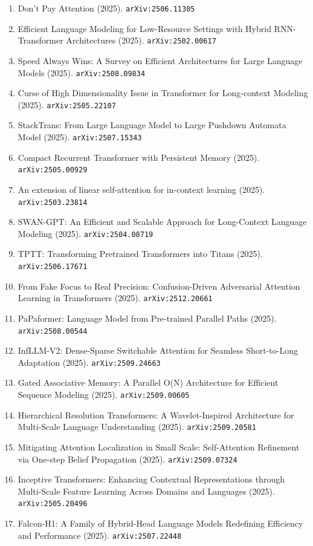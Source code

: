 \documentclass[11pt]{article}
\begin{document}
\begin{enumerate}
  \item Don't Pay Attention (2025). \texttt{arXiv:2506.11305}
  \item Efficient Language Modeling for Low-Resource Settings with Hybrid
  RNN-Transformer Architectures (2025). \texttt{arXiv:2502.00617}
  \item Speed Always Wins: A Survey on Efficient Architectures for Large Language Models (2025). \texttt{arXiv:2508.09834}
  \item Curse of High Dimensionality Issue in Transformer for Long-context Modeling (2025). \texttt{arXiv:2505.22107}
  \item StackTrans: From Large Language Model to Large Pushdown Automata Model (2025). \texttt{arXiv:2507.15343}
  \item Compact Recurrent Transformer with Persistent Memory (2025). \texttt{arXiv:2505.00929}
  \item An extension of linear self-attention for in-context learning (2025). \texttt{arXiv:2503.23814}
  \item SWAN-GPT: An Efficient and Scalable Approach for Long-Context Language
  Modeling (2025). \texttt{arXiv:2504.08719}
  \item TPTT: Transforming Pretrained Transformers into Titans (2025). \texttt{arXiv:2506.17671}
  \item From Fake Focus to Real Precision: Confusion-Driven Adversarial Attention Learning in Transformers (2025). \texttt{arXiv:2512.20661}
  \item PaPaformer: Language Model from Pre-trained Parallel Paths (2025). \texttt{arXiv:2508.00544}
  \item InfLLM-V2: Dense-Sparse Switchable Attention for Seamless Short-to-Long Adaptation (2025). \texttt{arXiv:2509.24663}
  \item Gated Associative Memory: A Parallel O(N) Architecture for Efficient Sequence Modeling (2025). \texttt{arXiv:2509.00605}
  \item Hierarchical Resolution Transformers: A Wavelet-Inspired Architecture for Multi-Scale Language Understanding (2025). \texttt{arXiv:2509.20581}
  \item Mitigating Attention Localization in Small Scale: Self-Attention Refinement via One-step Belief Propagation (2025). \texttt{arXiv:2509.07324}
  \item Inceptive Transformers: Enhancing Contextual Representations through Multi-Scale Feature Learning Across Domains and Languages (2025). \texttt{arXiv:2505.20496}
  \item Falcon-H1: A Family of Hybrid-Head Language Models Redefining Efficiency and Performance (2025). \texttt{arXiv:2507.22448}

\end{enumerate}
\end{document}
